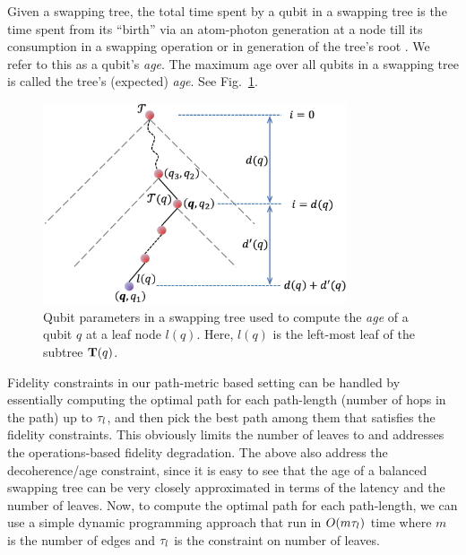 \begin{definition}
    Given a swapping tree, the total time spent by a qubit in a swapping
    tree is the time spent from its ``birth'' via an atom-photon \eps generation at a node till its consumption
    in a swapping operation or in generation of the tree's root \eps. 
    We refer to this as a qubit's \textit{age}. The maximum age over all qubits 
    in a swapping tree is called the tree's (expected) \textit{age}. See Fig.~\ref{fig:swapping_age}.
\end{definition}

\begin{figure}
    \centering
    \includegraphics[width=0.8\textwidth]{chapters/swappingtrees/figures/qubit-age.jpg}
  \caption{Qubit parameters in a swapping tree used to compute the \emph{age} of a qubit $q$ at a leaf node $l(q)$. Here, $l(q)$ is the left-most leaf of the subtree $\mathbf{T}(q)$.}
  \label{fig:swapping_age}
\end{figure}

Fidelity constraints in our path-metric based setting can be handled by essentially
computing the optimal path for each path-length (number of hops in the path) up to
$\tau_l$, and then pick the best path among them that satisfies the fidelity constraints.
This obviously limits the number of leaves to \fidl and addresses the operations-based
fidelity degradation. The above also address the decoherence/age
constraint, since it is easy to see %
that the age of a balanced swapping tree can be very closely 
approximated in terms of the latency and the number of leaves.
Now, to compute the optimal path for each path-length, we can use a simple dynamic
programming approach that run in $O(m\tau_l)$ time where $m$ is the number of edges 
and $\tau_l$ is the constraint on number of leaves. 